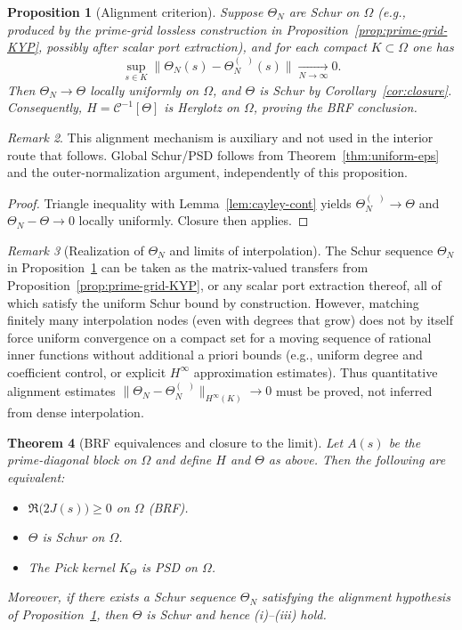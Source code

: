 \documentclass[11pt]{article}
\newtheorem{theorem}{Theorem}
\newtheorem{proposition}[theorem]{Proposition}
\theoremstyle{remark}
\newtheorem{remark}[theorem]{Remark}
\DeclareMathOperator{\dettwo}{det_2}
\begin{document}
\begin{proposition}[Alignment criterion]\label{prop:alignment-criterion}
Suppose \(\Theta_N\) are Schur on \(\Omega\) (e.g., produced by the prime-grid lossless construction in Proposition~\ref{prop:prime-grid-KYP}, possibly after scalar port extraction), and for each compact \(K\subset\Omega\) one has
\[
 \sup_{s\in K}\big\|\Theta_N(s)-\Theta_N^{(\dettwo)}(s)\big\|\xrightarrow[N\to\infty]{}0.
\]
Then \(\Theta_N\to\Theta\) locally uniformly on \(\Omega\), and \(\Theta\) is Schur by Corollary~\ref{cor:closure}. Consequently, \(H=\mathcal C^{-1}[\Theta]\) is Herglotz on \(\Omega\), proving the BRF conclusion.
\end{proposition}
\begin{remark}
This alignment mechanism is auxiliary and not used in the interior route that follows. Global Schur/PSD follows from Theorem~\ref{thm:uniform-eps} and the outer-normalization argument, independently of this proposition.
\end{remark}
\begin{proof}
Triangle inequality with Lemma~\ref{lem:cayley-cont} yields \(\Theta_N^{(\dettwo)}\to\Theta\) and \(\Theta_N-\Theta\to 0\) locally uniformly. Closure then applies.
\end{proof}

\begin{remark}[Realization of \(\Theta_N\) and limits of interpolation]
The Schur sequence \(\Theta_N\) in Proposition~\ref{prop:alignment-criterion} can be taken as the matrix-valued transfers from Proposition~\ref{prop:prime-grid-KYP}, or any scalar port extraction thereof, all of which satisfy the uniform Schur bound by construction. However, matching finitely many interpolation nodes (even with degrees that grow) does not by itself force uniform convergence on a compact set for a moving sequence of rational inner functions without additional a priori bounds (e.g., uniform degree and coefficient control, or explicit $H^\infty$ approximation estimates). Thus quantitative alignment estimates \(\|\Theta_N-\Theta_N^{(\dettwo)}\|_{H^\infty(K)}\to 0\) must be proved, not inferred from dense interpolation.
\end{remark}

\begin{theorem}[BRF equivalences and closure to the limit]\label{thm:BRF}
Let \(A(s)\) be the prime-diagonal block on \(\Omega\) and define \(H\) and \(\Theta\) as above. Then the following are equivalent:
\begin{itemize}
\item[(i)] \(\Re\big(2J(s)\big)\ge 0\) on \(\Omega\) (BRF).
 \item[(ii)] \(\Theta\) is Schur on \(\Omega\).
 \item[(iii)] The Pick kernel \(K_\Theta\) is PSD on \(\Omega\).
\end{itemize}
Moreover, if there exists a Schur sequence \(\Theta_N\) satisfying the alignment hypothesis of Proposition~\ref{prop:alignment-criterion}, then \(\Theta\) is Schur and hence (i)--(iii) hold.
\end{theorem}
\end{document}
